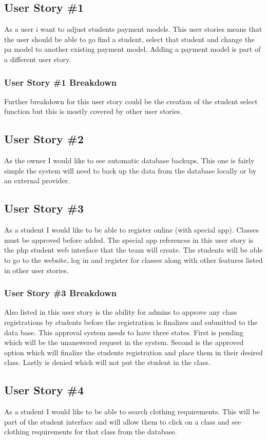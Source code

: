 \subsection{User Story \#1}
As a user i want to adjust students payment models. This user stories means that the user should be able to go find a student, select that student and change the pa model to another existing payment model. Adding a payment model is part of a different user story. 

\subsubsection{User Story \#1 Breakdown}
Further breakdown for this user story could be the creation of the student select function but this is mostly covered by other user stories.

\subsection{User Story \#2}
As the owner I would like to see automatic database backups. This one is fairly simple the system will need to back up the data from the database locally or by an external provider. 


\subsection{User Story \#3} 
As a student I would like to be able to register online (with special app). Classes must be approved before added. The special app references in this user story is the php student web interface that the team will create. The students will be able to go to the website, log in and register for classes along with other features listed in other user stories.

\subsubsection{User Story \#3 Breakdown}
Also listed in this user story is the ability for admins to approve any class registrations by students before the registration is finalizes and submitted to the data base. This approval system needs to have three states. First is pending which will be the unanswered request in the system. Second is the approved option which will finalize the students registration and place them in their desired class. Lastly is denied which will not put the student in the class.

\subsection{User Story \#4}
As a student I would like to be able to search clothing requirements. This will be part of the student interface and will allow them to click on a class and see clothing requirements for that class from the database.

